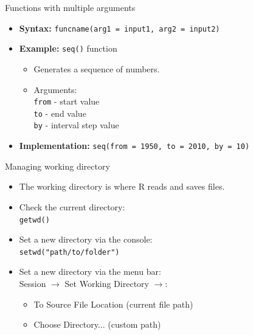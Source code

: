 \documentclass[aspectratio=169]{beamer}
\begin{document}
\begin{frame}{Functions with multiple arguments}

    \begin{itemize}
        \item \textbf{Syntax:} \texttt{funcname(arg1 = input1, arg2 = input2)}\smallskip
        \item \textbf{Example:} \texttt{seq()} function\smallskip
        \begin{itemize}
            \item[$\bullet$] Generates a sequence of numbers.\smallskip
            \item[$\bullet$] Arguments: \\
            \texttt{from} - start value \\
            \texttt{to} - end value \\
            \texttt{by} - interval step value\smallskip
        \end{itemize}
        \item \textbf{Implementation:} \texttt{seq(from = 1950, to = 2010, by = 10)}
    \end{itemize}
    
\end{frame}

\begin{frame}{Managing working directory}

    \begin{itemize}
        \item The working directory is where R reads and saves files.\smallskip
        \item Check the current directory: \\
        \texttt{getwd()}\smallskip
        \item Set a new directory via the console: \\
        \texttt{setwd("path/to/folder")}\smallskip
        \item Set a new directory via the menu bar: \\
        Session $\rightarrow$ Set Working Directory $\rightarrow$:
        \begin{itemize}
            \item[$\bullet$] To Source File Location (current file path)
            \item[$\bullet$] Choose Directory... (custom path)
        \end{itemize}
    \end{itemize}
\end{frame}
\end{document}
